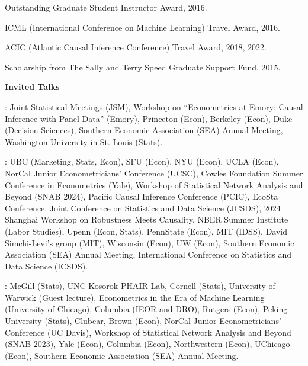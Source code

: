 \documentclass{article}
\begin{document}
Outstanding Graduate Student Instructor Award, 2016.

\vspace{2mm}
ICML (International Conference on Machine Learning) Travel Award, 2016.

\vspace{2mm}
ACIC (Atlantic Causal Inference Conference) Travel Award, 2018, 2022.

\vspace{2mm}
Scholarship from The Sally and Terry Speed Graduate Support Fund, 2015.

\vspace{5mm}

\begin{large}
\noindent \textbf{Invited Talks}
\end{large}

\vspace{4mm}
: Joint Statistical Meetings (JSM), Workshop on ``Econometrics at Emory: Causal Inference with Panel Data'' (Emory), Princeton (Econ), Berkeley (Econ), Duke (Decision Sciences), Southern Economic Association (SEA) Annual Meeting, Washington University in St. Louis (Stats).

\vspace{4mm}
: UBC (Marketing, Stats, Econ), SFU (Econ), NYU (Econ), UCLA (Econ), NorCal Junior Econometricians' Conference (UCSC), Cowles Foundation Summer Conference in Econometrics (Yale), Workshop of Statistical Network Analysis and Beyond (SNAB 2024), Pacific Causal Inference Conference (PCIC), EcoSta Conference, Joint Conference on Statistics and Data Science (JCSDS), 2024 Shanghai Workshop on Robustness Meets Causality, NBER Summer Institute (Labor Studies), Upenn (Econ, Stats), PennState (Econ), MIT (IDSS), David Simchi-Levi's group (MIT), Wisconsin (Econ), UW (Econ), Southern Economic Association (SEA) Annual Meeting, International Conference on Statistics and Data Science (ICSDS).

\vspace{4mm}
: McGill (Stats), UNC Kosorok PHAIR Lab, Cornell (Stats), University of Warwick (Guest lecture), Econometrics in the Era of Machine Learning (University of Chicago), Columbia (IEOR and DRO), Rutgers (Econ), Peking University (Stats), Clubear, Brown (Econ), NorCal Junior Econometricians' Conference (UC Davis), Workshop of Statistical Network Analysis and Beyond (SNAB 2023), Yale (Econ), Columbia (Econ), Northwestern (Econ), UChicago (Econ), Southern Economic Association (SEA) Annual Meeting.
\end{document}
